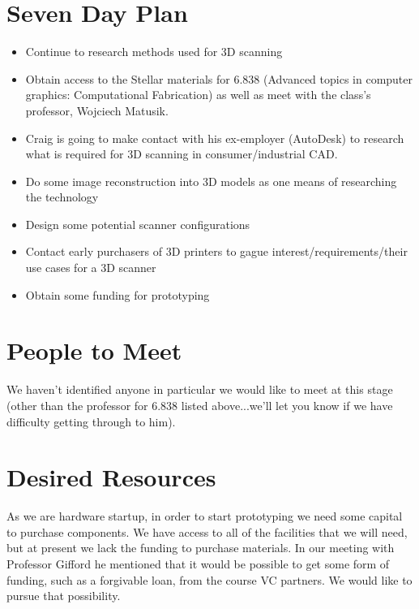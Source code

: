 \documentclass[10pt]{article}
\begin{document}
\section{Seven Day Plan} 
\begin{itemize} 
\item Continue to research methods used for 3D scanning
\item Obtain access to the Stellar materials for 6.838 (Advanced
  topics in computer graphics: Computational Fabrication) as well as meet with the
  class's professor, Wojciech Matusik. 
\item Craig is going to make contact with his ex-employer (AutoDesk) to research
  what is required for 3D scanning in consumer/industrial CAD. 
\item Do some image reconstruction into 3D models as one means of researching
  the technology
\item Design some potential scanner configurations
\item Contact early purchasers of 3D printers to gague
  interest/requirements/their use cases for a 3D scanner
\item Obtain some funding for prototyping
\end{itemize}

\section{People to Meet} We haven't identified anyone in particular we would
like to meet at this stage (other than the professor for 6.838 listed
above...we'll let you know if we have difficulty getting through to him).

\section{Desired Resources} As we are hardware startup, in
order to start prototyping we need some capital to purchase components. We
have access to all of the facilities that we will need, but at present we lack
the funding to purchase materials. In our meeting with Professor Gifford he
mentioned that it would be possible to get some form of funding, such as a
forgivable loan, from the course VC partners. We would like to pursue that possibility.
\end{document}
